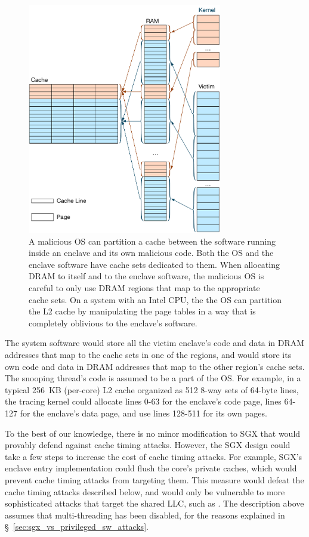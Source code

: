 \begin{figure}[hbt]
  \centering
  \includegraphics[width=85mm]{figures/cache_partitions.pdf}
  \caption{
    A malicious OS can partition a cache between the software running inside an
    enclave and its own malicious code. Both the OS and the enclave software
    have cache sets dedicated to them. When allocating DRAM to itself and to
    the enclave software, the malicious OS is careful to only use DRAM regions
    that map to the appropriate cache sets. On a system with an Intel CPU, the
    the OS can partition the L2 cache by manipulating the page tables in a way
    that is completely oblivious to the enclave's software.
  }
  \label{fig:cache_partitions}
\end{figure}

The system software would store all the victim enclave's code and data in DRAM
addresses that map to the cache sets in one of the regions, and would store its
own code and data in DRAM addresses that map to the other region's cache sets.
The snooping thread's code is assumed to be a part of the OS. For example, in
a typical 256~KB (per-core) L2 cache organized as 512 8-way sets of 64-byte
lines, the tracing kernel could allocate lines 0-63 for the enclave's code
page, lines 64-127 for the enclave's data page, and use lines 128-511 for its
own pages.

To the best of our knowledge, there is no minor modification to SGX that would
provably defend against cache timing attacks. However, the SGX design could
take a few steps to increase the cost of cache timing attacks. For example,
SGX's enclave entry implementation could flush the core's private caches, which
would prevent cache timing attacks from targeting them. This measure would
defeat the cache timing attacks described below, and would only be vulnerable
to more sophisticated attacks that target the shared LLC, such as
\cite{yarom2013llctiming, liu2015llctiming}. The description above assumes that
multi-threading has been disabled, for the reasons explained in
\S~\ref{sec:sgx_vs_privileged_sw_attacks}.


